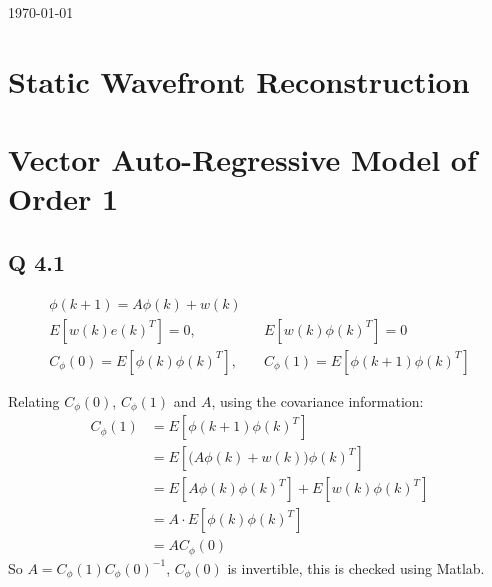 \documentclass[11pt, oneside,a4paper,fleqn]{report}
\begin{document}
\begin{titlepage}
{\large \today}\\[1cm]


 

\vfill 

\end{titlepage}


\tableofcontents


\chapter{\bf Static Wavefront Reconstruction}







\chapter{\bf Vector Auto-Regressive Model of Order 1}
\section*{Q 4.1}
\begin{align}
    \phi(k+1) = A\phi(k) + w(k)\\
    E[w(k)e(k)^T] = 0,& &E[w(k)\phi(k)^T] = 0\\
    C_\phi(0)=E[\phi(k)\phi(k)^T],& &C_\phi(1)=E[\phi(k+1)\phi(k)^T]
\end{align}

Relating $ C_\phi(0)$,  $C_\phi(1)$ and $A$, using the covariance information:
\begin{align}
    C_\phi(1)&=E[\phi(k+1)\phi(k)^T]\\
    &=E[\big(A\phi(k) + w(k)\big)\phi(k)^T]\\
    &=E[A\phi(k)\phi(k)^T] + E[w(k)\phi(k)^T]\\
    &=A \cdot E[\phi(k)\phi(k)^T]\\
    &=AC_\phi(0)
\end{align}
So $A=C_\phi(1)C_\phi(0)^{-1}$, $C_\phi(0)$ is invertible, this is checked using Matlab.
\end{document}
